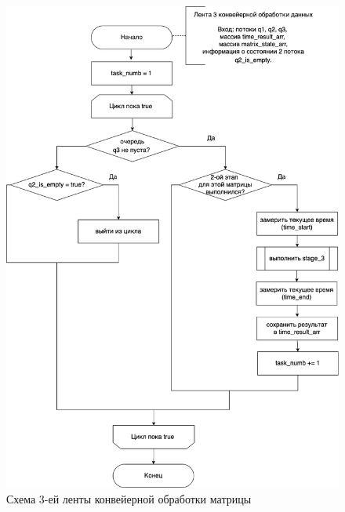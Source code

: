 \documentclass[a4paper,14pt, unknownkeysallowed]{extreport}
\begin{document}
\begin{figure}[h]
	\centering
	\includegraphics[scale=0.5]{img/parallel_stage_3.png}
	\caption{Схема 3-ей ленты конвейерной обработки матрицы}
	\label{fig:parallel_stage_3}
\end{figure} 

\clearpage
\end{document}
